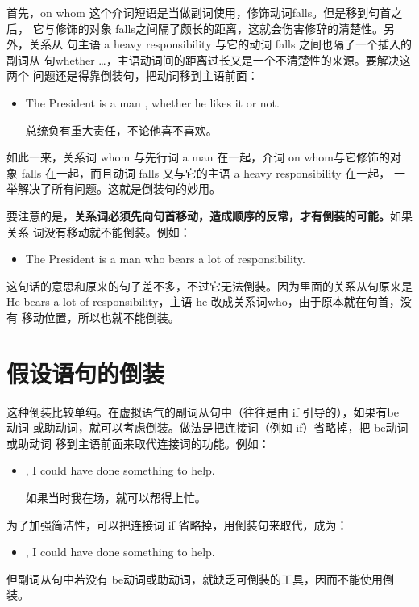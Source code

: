 首先，on whom 这个介词短语是当做副词使用，修饰动词falls。但是移到句首之后，
它与修饰的对象 falls之间隔了颇长的距离，这就会伤害修辞的清楚性。另外，关系从
句主语 a heavy responsibility 与它的动词 falls 之间也隔了一个插入的副词从
句whether \ldots{}，主语动词间的距离过长又是一个不清楚性的来源。要解决这两个
问题还是得靠倒装句，把动词移到主语前面：
\begin{itemize}
\item The President is a man ,
  whether he likes it or not.

  总统负有重大责任，不论他喜不喜欢。
\end{itemize}
如此一来，关系词 whom 与先行词 a man 在一起，介词 on whom与它修饰的对
象 falls 在一起，而且动词 falls 又与它的主语 a heavy responsibility 在一起，
一举解决了所有问题。这就是倒装句的妙用。

要注意的是，\textbf{关系词必须先向句首移动，造成顺序的反常，才有倒装的可能。}如果关系
词没有移动就不能倒装。例如：
\begin{itemize}
\item The President is a man who bears a lot of responsibility.
\end{itemize}
这句话的意思和原来的句子差不多，不过它无法倒装。因为里面的关系从句原来是He
bears a lot of responsibility，主语 he 改成关系词who，由于原本就在句首，没有
移动位置，所以也就不能倒装。

\section{假设语句的倒装}

这种倒装比较单纯。在虚拟语气的副词从句中（往往是由 if 引导的），如果有be 动词
或助动词，就可以考虑倒装。做法是把连接词（例如 if）省略掉，把 be动词或助动词
移到主语前面来取代连接词的功能。例如：
\begin{itemize}
\item {}, I could have done something to help.

  如果当时我在场，就可以帮得上忙。
\end{itemize}
为了加强简洁性，可以把连接词 if 省略掉，用倒装句来取代，成为：
\begin{itemize}
\item {}, I could have done something to help.
\end{itemize}

但副词从句中若没有 be动词或助动词，就缺乏可倒装的工具，因而不能使用倒装。

